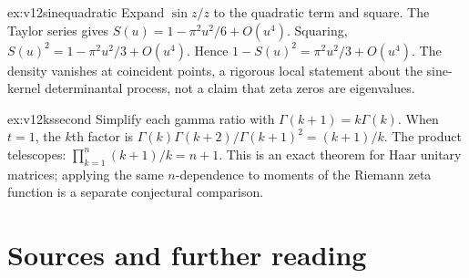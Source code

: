 \begin{solution}{ex:v12sinequadratic}
\idea Expand $\sin z/z$ to the quadratic term and square.
\writeup The Taylor series gives $S(u)=1-\pi^2u^2/6+O(u^4)$. Squaring, $S(u)^2=1-\pi^2u^2/3+O(u^4)$. Hence $1-S(u)^2=\pi^2u^2/3+O(u^4)$. The density vanishes at coincident points, a rigorous local statement about the sine-kernel determinantal process, not a claim that zeta zeros are eigenvalues.
\end{solution}

\begin{solution}{ex:v12kssecond}
\idea Simplify each gamma ratio with $\Gamma(k+1)=k\Gamma(k)$.
\writeup When $t=1$, the $k$th factor is $\Gamma(k)\Gamma(k+2)/\Gamma(k+1)^2=(k+1)/k$. The product telescopes: $\prod_{k=1}^n(k+1)/k=n+1$. This is an exact theorem for Haar unitary matrices; applying the same $n$-dependence to moments of the Riemann zeta function is a separate conjectural comparison.
\end{solution}

\section*{Sources and further reading}

